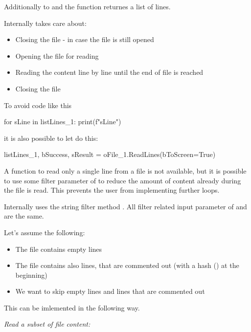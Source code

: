 Additionally to  and  the function returnes a list of lines.

Internally  takes care about:

\begin{itemize}
   \item Closing the file - in case the file is still opened
   \item Opening the file for reading
   \item Reading the content line by line until the end of file is reached
   \item Closing the file
\end{itemize}

To avoid code like this

\begin{pythoncode}
for sLine in listLines_1:
   print(f"{sLine}")
\end{pythoncode}

it is also possible to let  do this:

\begin{pythoncode}
listLines_1, bSuccess, sResult = oFile_1.ReadLines(bToScreen=True)
\end{pythoncode}

A function to read only a single line from a file is not available, but it is possible to use some filter parameter of 
to reduce the amount of content already during the file is read. This prevents the user from implementing further loops.

Internally  uses the string filter method . All filter related input parameter of
 and  are the same.

Let's assume the following:

\begin{itemize}
   \item The file  contains empty lines
   \item The file  contains also lines, that are commented out (with a hash (\pcode{\#}) at the beginning)
   \item We want  to skip empty lines and lines that are commented out
\end{itemize}

This can be imlemented in the following way.

\textit{Read a subset of file content:}

